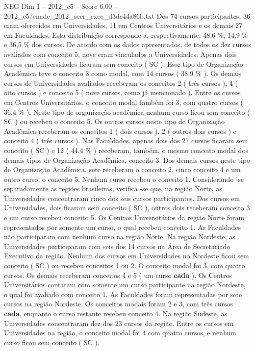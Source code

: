 \begin{textsample}{NEG Dim 1 – 2012\_c5 – Score 6.00 – 2012\_c5/enade\_2012\_secr\_exec\_d3dc44a86b.txt}
Dos 74 cursos participantes, 36 eram oferecidos em Universidades, 11 em Centros Universitários e os demais 27 em Faculdades.
Esta distribuição corresponde a, respectivamente, 48,6 \%, 14,9 \% e 36,5 \% dos cursos.
De acordo com os dados apresentados, de todos os dez cursos avaliados com conceito 5, nove eram vinculados a Universidades.
Apenas dois cursos em Universidades ficaram sem conceito ( SC ).
Esse tipo de Organização Acadêmica teve o conceito 3 como modal, com 14 cursos ( 38,9 \% ).
Os demais cursos de Universidades avaliados receberam os conceitos 2 ( três cursos ), 4 ( oito cursos ) e conceito 5 ( nove cursos, como já mencionado ).
Entre os cursos em Centros Universitários, o conceito modal também foi 3, com quatro cursos ( 36,4 \% ).
Neste tipo de organização acadêmica nenhum curso ficou sem conceito ( SC ) ou recebeu o conceito 5.
Os outros cursos neste tipo de Organização Acadêmica receberam os conceitos 1 ( dois cursos ), 2 ( outros dois cursos ) e conceito 4 ( três cursos ).
Nas Faculdades, apenas dois dos 27 cursos ficaram sem conceito ( SC ) e 12 ( 44,4 \% ) receberam, também, o mesmo conceito modal dos demais tipos de Organização Acadêmica, conceito 3.
Dos demais cursos neste tipo de Organização Acadêmica, sete receberam o conceito 2, cinco conceito 4 e um outro curso, o conceito 5.
Nenhum curso recebeu o conceito 1.
Considerando -se separadamente as regiões brasileiras, verifica -se que, na região Norte, as Universidades concentraram cinco dos seis cursos participantes.
Dos cursos em Universidades, dois ficaram sem conceito ( SC ), outros dois receberam conceito 3 e um curso recebeu conceito 5.
Os Centros Universitários da região Norte foram representados por somente um curso, o qual recebeu conceito 1.
As Faculdades não participaram com nenhum curso na região Norte.
Na região Nordeste, as Universidades participaram com seis dos 14 cursos na Área de Secretariado Executivo da região.
Nenhum dos cursos em Universidades no Nordeste ficou sem conceito ( SC ) ou recebeu conceitos 1 ou 2.
O conceito modal foi 3, com quatro cursos.
Os demais receberam conceitos 4 e 5 ( um curso \textbf{cada} ).
Os Centros Universitários contaram com somente um curso participante na região Nordeste, o qual foi avaliado com conceito 1.
As Faculdades foram representadas por sete cursos na região Nordeste.
Os conceitos modais foram 2 e 3, com três cursos \textbf{cada}, enquanto o curso restante recebeu conceito 4.
Na região Sudeste, as Universidades concentraram dez dos 23 cursos da região.
Entre os cursos em Universidades na região, o conceito modal foi 4 com quatro cursos, e nenhum curso ficou sem conceito ( SC ).

\end{textsample}
